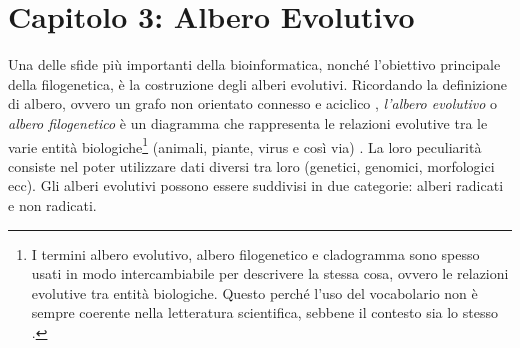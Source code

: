 \chapter{Capitolo 3: Albero Evolutivo}
Una delle sfide più importanti della bioinformatica, nonché l'obiettivo principale della filogenetica, è la costruzione degli alberi evolutivi.
\newline
Ricordando la definizione di albero, ovvero un grafo non orientato connesso e aciclico \cite{algoritmiEStruttureDati2}, \textit{l'albero evolutivo} o \textit{albero filogenetico} è un diagramma che rappresenta le relazioni evolutive tra le varie entità biologiche\footnote{I termini albero evolutivo, albero filogenetico e cladogramma sono spesso usati in modo intercambiabile per descrivere la stessa cosa, ovvero le relazioni evolutive tra entità biologiche. Questo perché l'uso del vocabolario non è sempre coerente nella letteratura scientifica, sebbene il contesto sia lo stesso \cite{bioinformaticsforbeginner}.} (animali, piante, virus e così via) \cite{buildingaphylogenictree}. La loro peculiarità consiste nel poter utilizzare dati diversi tra loro (genetici, genomici, morfologici ecc).
\newline
Gli alberi evolutivi possono essere suddivisi in due categorie: alberi radicati e non radicati.

